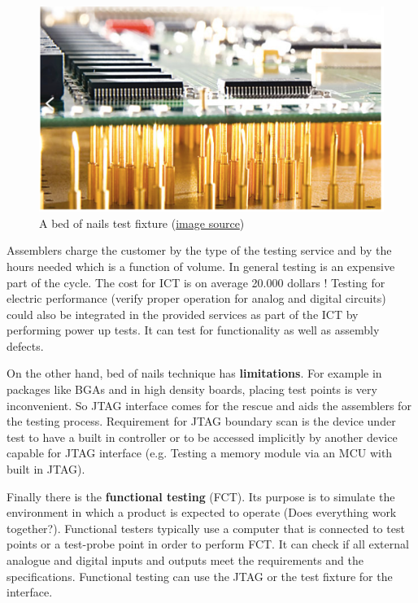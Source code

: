 \documentclass[final]{cubedoc}
\begin{document}
	
	\begin{figure}[h!]
		\centering
		\includegraphics[keepaspectratio, width=\textwidth, height=.25\textheight]{assets/bed_of_nails.png}
		\caption{A bed of nails test fixture \small{(\href{https://web.archive.org/web/20200814200932/https://hackaday.com/2019/02/09/test-pcbs-on-a-bed-of-nails/}{image source}})}
	\end{figure}
	
	
	Assemblers charge the customer by the type of the testing service and by the hours needed which is a function of volume. In general testing is an expensive part of the cycle.
	The cost for ICT is on average 20.000 dollars \cite{wiki:flying}! 
	Testing for electric performance (verify proper operation for analog and digital circuits) could also be integrated in the provided services as part of the ICT by performing power up tests. It can test for functionality as well as assembly defects.
	
	On the other hand, bed of nails technique has \textbf{limitations}. For example in packages like BGAs and in high density boards, placing test points is very inconvenient. So JTAG interface comes for the rescue and aids the assemblers for the testing process. Requirement for JTAG boundary scan is the device under test to have a built in controller or to be accessed implicitly by another device capable for JTAG interface (e.g. Testing a memory module via an MCU with built in JTAG).
	
	Finally there is the \textbf{functional testing} (FCT). Its purpose is to simulate the environment in which a product is expected to operate (Does everything work together?). Functional testers typically use a computer that is connected to test points or a test-probe point in order to perform FCT.
	It can check if all external analogue and digital inputs and outputs meet the requirements and the specifications. Functional testing can use the JTAG or the test fixture for the interface. 
	
\end{document}
